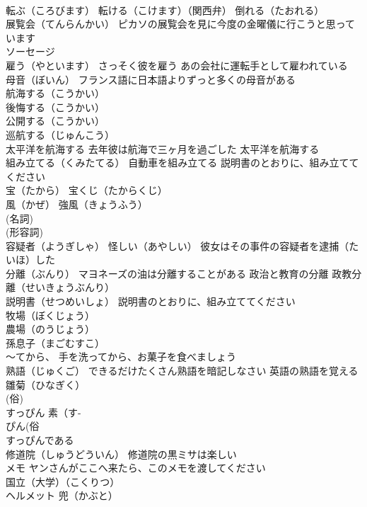 \documentclass[8pt]{extreport}
\begin{document}
\begin{CJK}{UTF8}{min}
\\	転ぶ（ころびます） 転ける（こけます）（関西弁） 倒れる（たおれる）
\\	展覧会（てんらんかい） ピカソの展覧会を見に今度の金曜儀に行こうと思っています
\\	ソーセージ
\\	雇う（やといます） さっそく彼を雇う あの会社に運転手として雇われている
\\	母音（ぼいん） フランス語に日本語よりずっと多くの母音がある
\\	航海する（こうかい） 
\\	後悔する（こうかい） 
\\	公開する（こうかい）
\\	巡航する（じゅんこう） 
\\	太平洋を航海する 去年彼は航海で三ヶ月を過ごした 太平洋を航海する
\\	組み立てる（くみたてる） 自動車を組み立てる 説明書のとおりに、組み立ててください
\\	宝（たから） 宝くじ（たからくじ）
\\	風（かぜ） 強風（きょうふう）
\\	(名詞) 
\\	(形容詞) 
\\	容疑者（ようぎしゃ） 怪しい（あやしい） 彼女はその事件の容疑者を逮捕（たいほ）した
\\	分離（ぶんり） マヨネーズの油は分離することがある 政治と教育の分離 政教分離（せいきょうぶんり）
\\	説明書（せつめいしょ） 説明書のとおりに、組み立ててください
\\	牧場（ぼくじょう）
\\	農場（のうじょう）
\\	孫息子（まごむすこ）
\\	～てから、 手を洗ってから、お菓子を食べましょう
\\	熟語（じゅくご） できるだけたくさん熟語を暗記しなさい 英語の熟語を覚える
\\	雛菊（ひなぎく）
\\	(俗) 
\\	すっぴん 素（す-
\\	ぴん(俗 
\\	すっぴんである
\\	修道院（しゅうどういん） 修道院の黒ミサは楽しい
\\	メモ ヤンさんがここへ来たら、このメモを渡してください
\\	国立（大学）（こくりつ）
\\	ヘルメット 兜（かぶと） 

\end{CJK}
\end{document}
